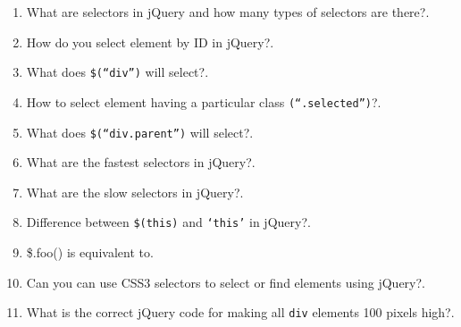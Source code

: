 \documentclass[11pt,a4paper]{article}
\begin{document}
\begin{enumerate}
\item What are selectors in jQuery and how many types of selectors are there?\underline{\hspace{3cm}}.

\item How do you select element by ID in jQuery?\underline{\hspace{3cm}}.

\item What does \texttt{\$(``div'')} will select?\underline{\hspace{3cm}}.

\item How to select element having a particular class \texttt{(``.selected'')}?\underline{\hspace{3cm}}.

\item What does \texttt{\$(``div.parent'')} will select?\underline{\hspace{3cm}}.

\item What are the fastest selectors in jQuery?\underline{\hspace{3cm}}.

\item What are the slow selectors in jQuery?\underline{\hspace{3cm}}.

\item Difference between \texttt{\$(this)} and \texttt{`this'} in jQuery?\underline{\hspace{3cm}}.

\item \$.foo() is equivalent to\underline{\hspace{3cm}}.

\item Can you can use CSS3 selectors to select or find elements using jQuery?\underline{\hspace{3cm}}.

\item What is the correct jQuery code for making all \texttt{div} elements 100 pixels high?\underline{\hspace{3cm}}.

\end{enumerate}
\end{document}
